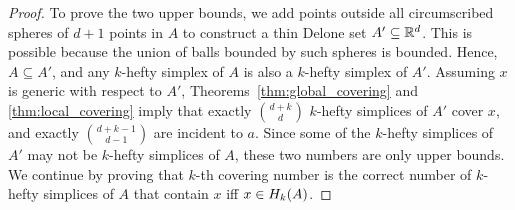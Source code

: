 \documentclass[10pt,a4paper]{article}
\newcommand {\mm}[1] {\ifmmode{#1}\else{\mbox{\(#1\)}}\fi}
\theoremstyle{plain}
\newcommand{\Rspace}        {\mm{{\mathbb R}}}
\newcommand{\Hull}[2]       {\mm{{H}_{#1}{({#2})}}}
\begin{document}
\begin{proof}
  To prove the two upper bounds, we add points outside all circumscribed spheres of $d+1$ points in $A$ to construct a thin Delone set $A' \subseteq \Rspace^d$.
  This is possible because the union of balls bounded by such spheres is bounded.
  Hence, $A \subseteq A'$, and any $k$-hefty simplex of $A$ is also a $k$-hefty simplex of $A'$.
  Assuming $x$ is generic with respect to $A'$, Theorems~\ref{thm:global_covering} and \ref{thm:local_covering} imply that exactly $\binom{d+k}{d}$ $k$-hefty simplices of $A'$ cover $x$, and exactly $\binom{d+k-1}{d-1}$ are incident to $a$.
  Since some of the $k$-hefty simplices of $A'$ may not be $k$-hefty simplices of $A$, these two numbers are only upper bounds.
  We continue by proving that $k$-th covering number is the correct number of $k$-hefty simplices of $A$ that contain $x$ iff $x \in \Hull{k}{A}$.
    

\end{proof}
\end{document}
